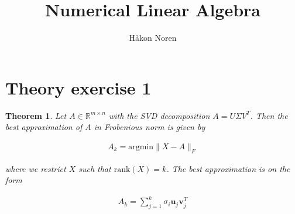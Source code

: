 \documentclass[11pt,a4paper,english]{elsarticle}%
\newtheorem{theorem}{Theorem}
\begin{document}
\begin{frontmatter}

\title{Numerical Linear Algebra}
\author[matematikk]{Håkon Noren}
\address[matematikk]{Department of Mathematical Science, Norwegian University of Science and Technology, N-7491 Trondheim, Norway.}
\end{frontmatter}

\section{Theory exercise 1}


\begin{theorem}
  Let $A \in \mathbb{R}^{m \times n}$ with the SVD decomposition $A = U\Sigma V^T$. Then the best approximation of $A$ in Frobenious norm is given by

  \begin{align*}
    A_k = \text{argmin}\|X - A\|_F
  \end{align*}

  where we restrict $X$ such that $\text{rank}(X) = k$. The best approximation is on the form

  \begin{align*}
    A_k = \sum_{j=1}^k \sigma_i\bm u_j \bm v_j^T
  \end{align*}
\end{theorem}
\end{document}
